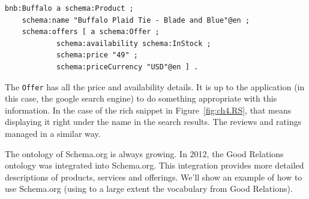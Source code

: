 \begin{lstlisting}
bnb:Buffalo a schema:Product ;
    schema:name "Buffalo Plaid Tie - Blade and Blue"@en ;
    schema:offers [ a schema:Offer ;
            schema:availability schema:InStock ;
            schema:price "49" ;
            schema:priceCurrency "USD"@en ] .
\end{lstlisting}


The \texttt{Offer} has all the price and availability details.  It is up to the 
application (in this case, the google search engine) to do something appropriate
with this information.  In the case of the rich snippet in Figure~\ref{fig:ch4.RS}, that
means displaying it right under the name in the search results.  The reviews and ratings 
managed in a similar way. 

The ontology of Schema.org is always growing.  In 2012, the Good Relations ontology
was integrated into Schema.org.  This integration provides more detailed descriptions of 
products, services and offerings.  We'll show an example of how to use Schema.org 
(using to a large extent the vocabulary from Good Relations).

